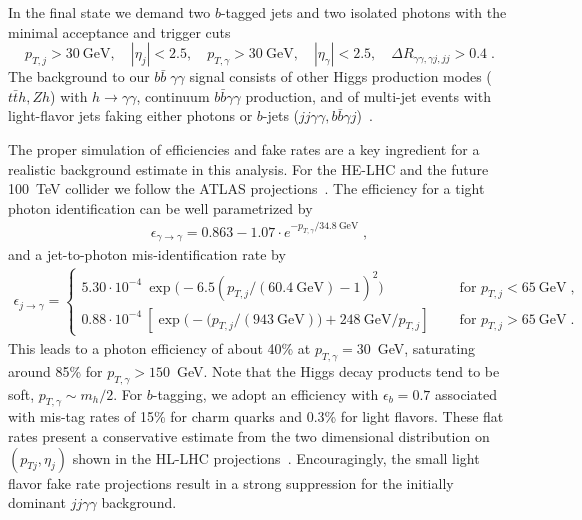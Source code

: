 In the final state we demand two $b$-tagged jets and
two isolated photons with the minimal acceptance and trigger cuts
%
\begin{equation}
p_{T,j}>30~\text{GeV} , \quad  
|\eta_j |<2.5, \quad 
p_{T,\gamma}>30~\text{GeV}, \quad  
|\eta_\gamma| <2.5 , \quad 
\Delta R_{\gamma \gamma, \gamma j, jj} >0.4 \; .
\label{eq:base_selections}
\end{equation}
%
The background to our $b\bar{b} \; \gamma \gamma$ signal consists of
other Higgs production modes ($t\bar{t}h, Zh$) with $h \to \gamma
\gamma$, continuum $b\bar{b}\gamma\gamma$ production, and of multi-jet
events with light-flavor jets faking either photons or $b$-jets
($jj\gamma\gamma, b\bar{b}\gamma j$)~\cite{hh-gamma}.  

The proper simulation of efficiencies and fake rates are a key
ingredient for a realistic background estimate in this analysis.  For
the HE-LHC and the future 100~TeV collider we follow the ATLAS
projections~\cite{performance}. The efficiency for a tight photon 
identification can be well parametrized by
%
\begin{align}
\epsilon_{\gamma\to\gamma} = 0.863 - 1.07 \cdot e^{-p_{T,\gamma}/34.8~\text{GeV}}\;,
\end{align}
%
and a jet-to-photon mis-identification rate by
\begin{align}
\epsilon_{j\to\gamma} = 
\begin{cases} 
5.30\cdot 10^{-4}  \ \exp\big( -6.5 \left( p_{T,j}/(60.4~\text{GeV})- 1 \right)^2 \big) 
\quad &\text{ for } p_{T,j} <65~\text{GeV} \;, \\
0.88 \cdot 10^{-4} \  \left[ \exp \big( -(p_{T,j}/(943~\text{GeV}) \big) +248~\text{GeV}/p_{T,j}\right]
\quad &\text{ for } p_{T,j} >65~\text{GeV} \;.
\end{cases}
\end{align}
%
This leads to a photon efficiency of about 40\% at $p_{T,\gamma}=30$~GeV,
saturating around 85\% for $p_{T,\gamma}>150$~GeV. Note that the 
Higgs decay products tend to be soft, $p_{T,\gamma}\sim m_h/2$. 
For $b$-tagging, we adopt an efficiency with $\epsilon_b =0.7$ associated 
with mis-tag rates of 15\% for charm quarks and 0.3\% for
light flavors. These flat rates present a conservative estimate from
the two dimensional distribution on $(p_{Tj},\eta_j)$ shown in the
HL-LHC projections~\cite{madmax-hh}. Encouragingly, the small light
flavor fake rate projections result in a strong suppression for the
initially dominant $jj\gamma\gamma$ background.

